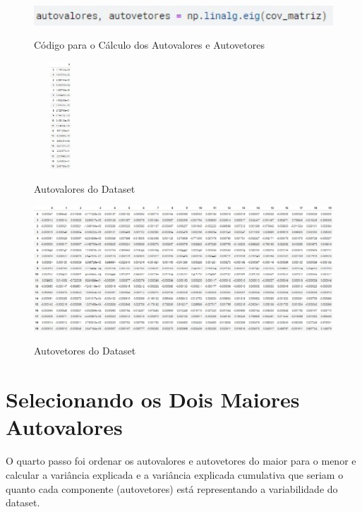 \documentclass{report}
\begin{document}
\begin{figure}[htbp]
\centering
\caption{Código para o Cálculo dos Autovalores e Autovetores}
\includegraphics[width=12cm]
{figures/cod_autos.jpg}
\label{figura com o código dos autovalores e autovetores}
\end{figure}

\begin{figure}[htbp]
\centering
\caption{Autovalores do Dataset}
\includegraphics[width=2cm, height=4cm]{figures/autovalores.jpg}
\label{figura com os autovalores}
\end{figure}

\begin{figure}[htbp]
\centering
\caption{Autovetores do Dataset}
\includegraphics[width=12cm]{figures/autovetores.jpg}
\label{figura com os autovetores}
\end{figure}

\section{Selecionando os Dois Maiores Autovalores}
O quarto passo foi ordenar os autovalores e autovetores do maior para o menor e calcular a variância explicada e a variância explicada cumulativa que seriam o quanto cada componente (autovetores) está representando a variabilidade do dataset.
\end{document}
